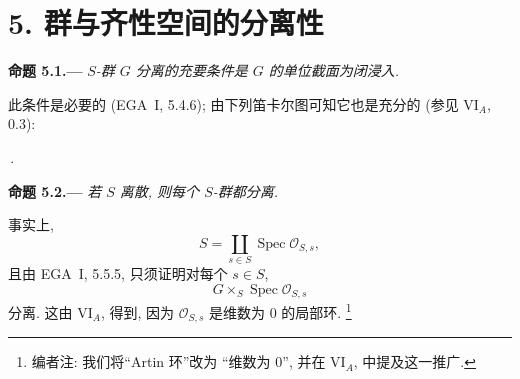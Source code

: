 
\section*{5. 群与齐性空间的分离性}
\label{sec:sga3-VIB-5}%

\medskip
{}\label{prop:sga3-VIB-5.1}%
\noindent\textbf{命题 5.1.---}
\emph{\(S\)-群 \(G\) 分离的充要条件是 \(G\) 的单位截面为闭浸入.}

此条件是必要的 (EGA~I, 5.4.6); 由下列笛卡尔图可知它也是充分的
(参见 VI\(_A\), 0.3):
\begin{center}
  \label{diag:sga3-VIB-5.1-cartesian}%
  \,.
\end{center}

\medskip
{}\label{prop:sga3-VIB-5.2}%
\noindent\textbf{命题 5.2.---}
\emph{若 \(S\) 离散, 则每个 \(S\)-群都分离.}

事实上,
\[
  S=\coprod_{s\in S}\operatorname{Spec}\mathcal O_{S,s},
\]
且由 EGA~I, 5.5.5, 只须证明对每个 \(s\in S\),
\[
  G\times_S\operatorname{Spec}\mathcal O_{S,s}
\]
分离. 这由 VI\(_A\),  得到,
因为 \(\mathcal O_{S,s}\) 是维数为 \(0\) 的局部环.%
\footnote{\label{note:sga3-VIB-33}编者注: 我们将``Artin 环''改为
``维数为 \(0\)'', 并在 VI\(_A\),  中提及这一推广.}

